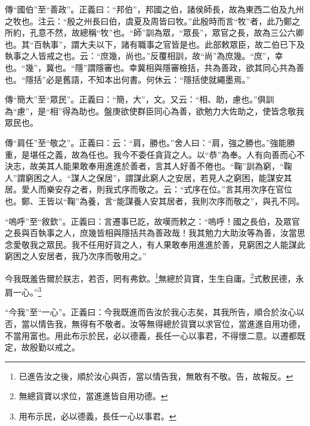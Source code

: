 {\noindent\zhuan{}\fzbyks 傳“國伯”至“善政”。正義曰：“邦伯”，邦國之伯，諸侯師長，故為東西二伯及九州之牧也。注云：“殷之州長曰伯，虞夏及周皆曰牧。”此殷時而言“牧”者，此乃鄭之所約，孔意不然，故總稱“牧”也。“師”訓為眾，“眾長”，眾官之長，故為三公六卿也。其“百執事”，謂大夫以下，諸有職事之官皆是也。此部敕眾臣，故二伯已下及執事之人皆戒之也。云：“庶幾，尚也。”反覆相訓，故“尚”為庶幾。“庶”，幸也。“幾”，冀也。“隱”謂隱審也。幸冀相與隱審檢括，共為善政，欲其同心共為善也。“隱括”必是舊語，不知本出何書。何休云：“隱括使就繩墨焉。” \par}

{\noindent\zhuan{}\fzbyks 傳“簡大”至“眾民”。正義曰：“簡，大”，文。又云：“相、助，慮也。”俱訓為“慮”，是“相”得為助也。盤庚欲使群臣同心為善，欲勉力大佐助之，使皆念敬我眾民也。 \par}

{\noindent\zhuan{}\fzbyks 傳“肩任”至“敬之”。正義曰：云：“肩，勝也。”舍人曰：“肩，強之勝也。”強能勝重，是堪任之義，故為任也。我今不委任貪貨之人。以“恭”為奉。人有向善而心不決志，故美其人能果敢奉用進進於善者，言其人好善不倦也。“鞠”訓為窮，“鞠人”謂窮困之人。“謀人之保居”，謂謀此窮人之安居，若見人之窮困，能謀安其居。愛人而樂安存之者，則我式序而敬之。云：“式序在位。”言其用次序在官位也。鄭、王皆以“鞠”為養，言“能謀養人安其居者，我則次序而敬之”，與孔不同。 \par}

{\noindent\shu{}\fzkt “嗚呼”至“敘欽”。正義曰：言遷事已訖，故嘆而敕之：“嗚呼！國之長伯，及眾官之長與百執事之人，庶幾皆相與隱括共為善政哉！我其勉力大助汝等為善，汝當思念愛敬我之眾民。我不任用好貨之人，有人果敢奉用進進於善，見窮困之人能謀此窮困之人安居者，我乃次序而敬用之。” \par}

今我既羞告爾於朕志，若否，罔有弗欽。\footnote{已進告汝之後，順於汝心與否，當以情告我，無敢有不敬。告，故報反。}無總於貨寶，生生自庸。\footnote{無總貨寶以求位，當進進皆自用功德。}式敷民德，永肩一心。”\footnote{用布示民，必以德義，長任一心以事君。}

{\noindent\shu{}\fzkt “今我”至“一心”。正義曰：今我既進而告汝於我心志矣，其我所告，順合於汝心以否，當以情告我，無得有不敬者。汝等無得總於貨寶以求官位，當進進自用功德，不當用富也。用此布示於民，必以德義，長任一心以事君，不得懷二意。以遷都既定，故殷勤以戒之。 \par}

